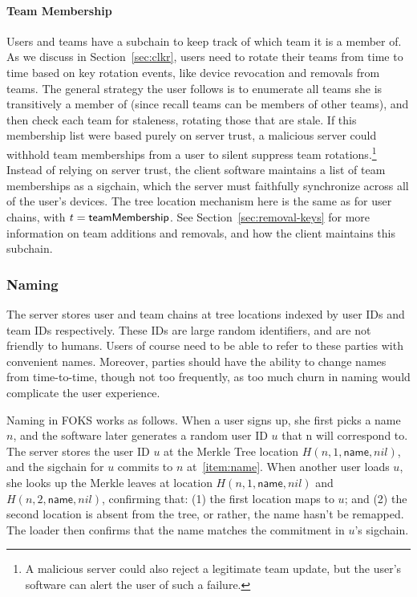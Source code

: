 \paragraph{Team Membership} Users and teams have a subchain to keep track
of which team it is a member of. As we discuss in Section~\ref{sec:clkr},
users need to rotate their teams from time to time based on key rotation
events, like device revocation and removals from teams. The general strategy
the user follows is to enumerate all teams she is transitively a member
of (since recall teams can be members of other teams), and then check
each team for staleness, rotating those that are stale. If this membership
list were based purely on server trust, a malicious server could withhold
team memberships from a user to silent suppress team rotations.\footnote{
    A malicious server could also reject a legitimate team update, but the user's
    software can alert the user of such a failure.
} Instead of relying on server trust, the client software maintains a list
of team memberships as a sigchain, which the server must faithfully
synchronize across all of the user's devices. The tree location
mechanism here is the same as for user chains, with $t = \textsf{teamMembership}$.
See Section~\ref{sec:removal-keys} for more information on team additions
and removals, and how the client maintains this subchain.

\subsubsection{Naming}
\label{sec:naming}

The server stores user and team chains at tree locations indexed by user IDs
and team IDs respectively. These IDs are large random identifiers, and are not
friendly to humans. Users of course need to be able to refer to these parties
with convenient names. Moreover, parties should have the ability to change
names from time-to-time, though not too frequently, as too much churn in naming would
complicate the user experience. 

Naming in FOKS works as follows. When a user signs up, she first picks a name
$n$, and the software later generates a random user ID $u$ that n will
correspond to. The server stores the user ID $u$ at the Merkle Tree
location $H(n, 1, \textsf{name}, nil)$, and the sigchain for $u$
commits to $n$ at~\ref{item:name}. When another user loads $u$, she
looks up the Merkle leaves at location $H(n, 1, \textsf{name}, nil)$
and $H(n, 2, \textsf{name}, nil)$, confirming that: (1) the first location
maps to $u$; and (2) the second location is absent from the tree,
or rather, the name hasn't be remapped. The loader then confirms
that the name matches the commitment in $u$'s sigchain. 

